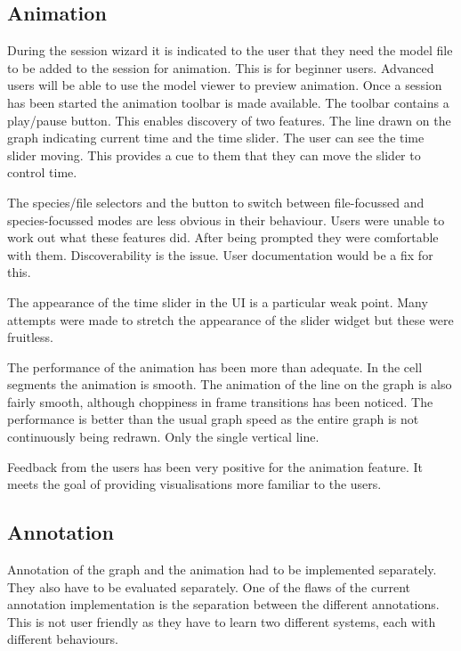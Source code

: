
\subsection{Animation}

During the session wizard it is indicated to the user that they need the model file to be added to the session for animation.  This is for beginner users.  Advanced users will be able to use the model viewer to preview animation.  Once a session has been started the animation toolbar is made available.  The toolbar contains a play/pause button.  This enables discovery of two features.  The line drawn on the graph indicating current time and the time slider.  The user can see the time slider moving.  This provides a cue to them that they can move the slider to control time.

The species/file selectors and the button to switch between file-focussed and species-focussed modes are less obvious in their behaviour.  Users were unable to work out what these features did.  After being prompted they were comfortable with them.  Discoverability is the issue.  User documentation would be a fix for this.

The appearance of the time slider in the \ac{UI} is a particular weak point.  Many attempts were made to stretch the appearance of the slider widget but these were fruitless.

The performance of the animation has been more than adequate.  In the cell segments the animation is smooth.  The animation of the line on the graph is also fairly smooth, although choppiness in frame transitions has been noticed.  The performance is better than the usual graph speed as the entire graph is not continuously being redrawn.  Only the single vertical line.

Feedback from the users has been very positive for the animation feature.  It meets the goal of providing visualisations more familiar to the users.

\subsection{Annotation}

Annotation of the graph and the animation had to be implemented separately.  They also have to be evaluated separately.  One of the flaws of the current annotation implementation is the separation between the different annotations.  This is not user friendly as they have to learn two different systems, each with different behaviours.

